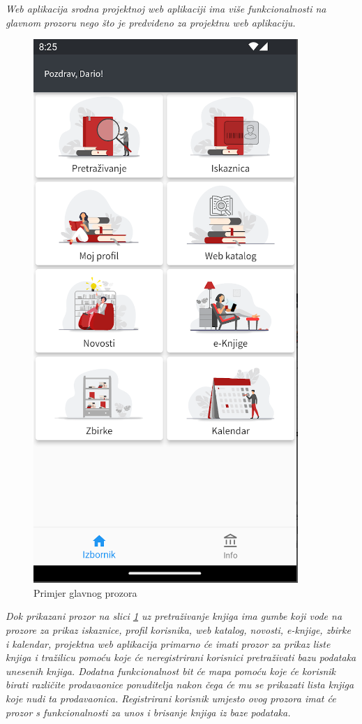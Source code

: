 	\textit{Web aplikacija srodna projektnoj web aplikaciji ima više funkcionalnosti na glavnom prozoru nego što je predviđeno za projektnu web aplikaciju.}

	\begin{figure}[H]
		\includegraphics[scale=0.4]{slike/MainScreen.PNG} %
		\centering
		\caption{Primjer glavnog prozora}
		\label{fig:glavni prozor}
	\end{figure}	
	
	\textit{Dok prikazani prozor na slici \ref{fig:glavni prozor} uz pretraživanje knjiga ima gumbe koji vode na prozore za prikaz iskaznice, profil korisnika, web katalog, novosti, e-knjige, zbirke i kalendar, projektna web aplikacija primarno će imati prozor za prikaz liste knjiga i tražilicu pomoću koje će neregistrirani korisnici pretraživati bazu podataka unesenih knjiga. Dodatna funkcionalnost bit će mapa pomoću koje će korisnik birati različite prodavaonice ponuditelja nakon čega će mu se prikazati lista knjiga koje nudi ta prodavaonica. Registrirani korisnik umjesto ovog prozora imat će prozor s funkcionalnosti za unos i brisanje knjiga iz baze podataka.}
	
